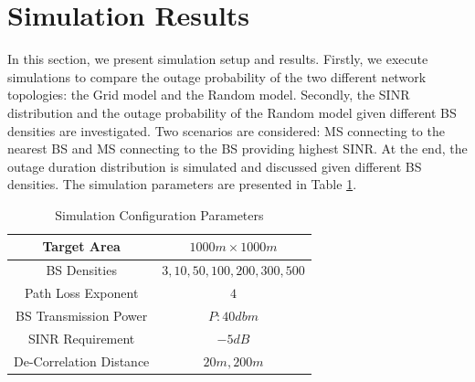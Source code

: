  \section{Simulation Results}
 \label{4:SimuProb}
 \par In this section, we present simulation setup and results. Firstly, we execute simulations to compare the outage probability of the two different network topologies: the Grid model and the Random model. Secondly, the SINR distribution and the outage probability of the Random model given different BS densities are investigated. Two scenarios are considered: MS connecting to the nearest BS and MS connecting to the BS providing highest SINR. At the end, the outage duration distribution is simulated and discussed given different BS densities. The simulation parameters are presented in Table \ref{SystemConfig2}. 
 \begin{table}
 \centering
 \caption{\label{SystemConfig2}Simulation Configuration Parameters}

 \begin{tabular}{|c|c|}

 \hline
 Target Area & $1000m\times 1000m$\\
 \hline
 BS Densities & $3, 10, 50, 100, 200, 300, 500$\\
 \hline
 Path Loss Exponent & $4$\\
 \hline
 BS Transmission Power & $P: 40dbm$\\
 \hline
 SINR Requirement & $-5dB$\\
 \hline
 De-Correlation Distance & $20m, 200m$\\
 \hline
 \end{tabular}

 \end{table}

